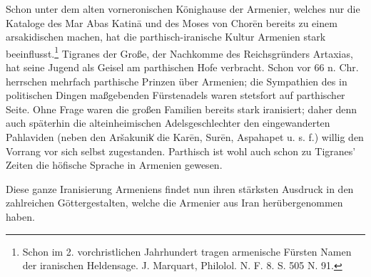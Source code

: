 \documentclass{article}
\begin{document}
Schon unter dem alten vorneronischen Könighause der Armenier, welches nur die Kataloge des Mar Abas Katinā und des Moses von Chorēn bereits zu einem arsakidischen machen, hat die parthisch-iranische Kultur Armenien stark beeinflusst.\footnote{Schon im 2. vorchristlichen Jahrhundert tragen armenische Fürsten Namen der iranischen Heldensage. J. Marquart, Philolol. N. F. 8. S. 505 N. 91.} Tigranes der Große, der Nachkomme des Reichsgründers Artaxias, hat seine Jugend als Geisel am parthischen Hofe verbracht. Schon vor 66 n. Chr. herrschen mehrfach parthische Prinzen über Armenien; die Sympathien des in politischen Dingen maßgebenden Fürstenadels waren stetsfort auf parthischer Seite. Ohne Frage waren die großen Familien bereits stark iranisiert; daher denn auch späterhin die alteinheimischen Adelsgeschlechter den eingewanderten Pahlaviden (neben den Aršakunik͑ die Karēn, Surēn, Aspahapet u. s. f.) willig den Vorrang vor sich selbst zugestanden. Parthisch ist wohl auch schon zu Tigranes' Zeiten die höfische Sprache in Armenien gewesen.

Diese ganze Iranisierung Armeniens findet nun ihren stärksten Ausdruck in den zahlreichen Göttergestalten, welche die Armenier aus Iran herübergenommen haben.
\end{document}
